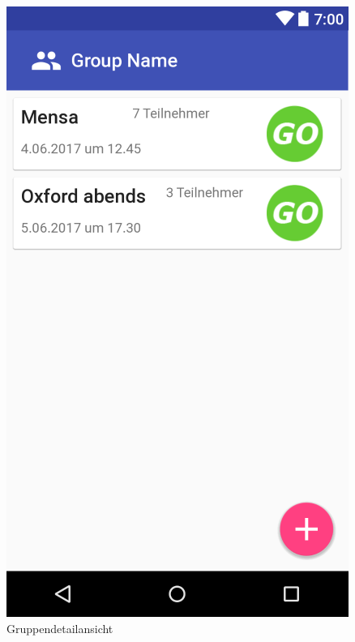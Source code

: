 \documentclass[parskip=full]{scrartcl}
\begin{document}
\begin{figure}[H]
  \vspace{1cm}
  \centering
  \begin{minipage}[b]{0.4\textwidth}
    \includegraphics[width=\textwidth]{GUI/AndroidStudio/group_view.PNG}
	\caption{Gruppendetailansicht}\label{gruppendetailansicht}
  \end{minipage}
  \hfill
  \begin{minipage}[b]{0.4\textwidth}

\end{minipage}
\end{figure}
\end{document}
